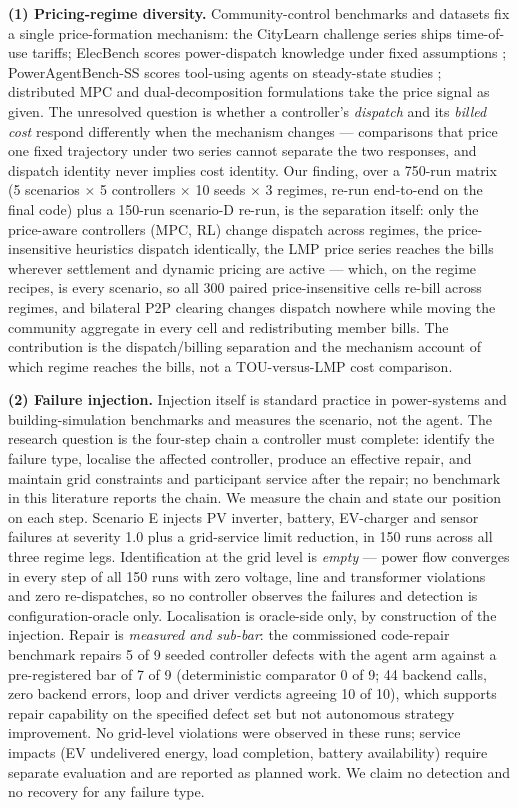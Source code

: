 \documentclass[11pt,a4paper]{article}
\begin{document}
\textbf{(1) Pricing-regime diversity.} Community-control benchmarks and datasets
fix a single price-formation mechanism: the CityLearn challenge series ships
time-of-use tariffs; ElecBench scores power-dispatch knowledge under fixed
assumptions \cite{zhou2025elecbench}; PowerAgentBench-SS scores tool-using
agents on steady-state studies \cite{mylonas2026poweragentbench}; distributed
MPC and dual-decomposition formulations \cite{yfantis2024dual, su2021dual} take
the price signal as given. The unresolved question is whether a controller's
\emph{dispatch} and its \emph{billed cost} respond differently when the
mechanism changes --- comparisons that price one fixed trajectory under two
series cannot separate the two responses, and dispatch identity never implies
cost identity. Our finding, over a 750-run matrix (5 scenarios $\times$ 5
controllers $\times$ 10 seeds $\times$ 3 regimes, re-run end-to-end on the
final code) plus a 150-run scenario-D re-run, is the separation itself: only
the price-aware controllers (MPC, RL)
change dispatch across regimes, the price-insensitive heuristics dispatch
identically, the LMP price series reaches the bills wherever settlement and
dynamic pricing are active --- which, on the regime recipes, is every
scenario, so all 300 paired price-insensitive cells re-bill across regimes,
and bilateral P2P clearing changes dispatch nowhere while moving the
community aggregate in every cell and redistributing member bills. The
contribution is the dispatch/billing
separation and the mechanism account of which regime reaches the bills, not a
TOU-versus-LMP cost comparison.

\textbf{(2) Failure injection.} Injection itself is standard practice in
power-systems and building-simulation benchmarks and measures the scenario,
not the agent. The research question is the four-step chain a controller must
complete: identify the failure type, localise the affected controller, produce
an effective repair, and maintain grid constraints and participant service
after the repair; no benchmark in this literature reports the chain. We measure
the chain and state our position on each step. Scenario E injects PV inverter,
battery, EV-charger and sensor failures at severity 1.0 plus a grid-service
limit reduction, in 150 runs across all three regime legs. Identification at
the grid level is \emph{empty} --- power flow converges in every step of all
150 runs with zero voltage, line and transformer violations and zero
re-dispatches, so no controller observes the failures and detection is
configuration-oracle only. Localisation is oracle-side only, by construction of
the injection. Repair is \emph{measured and sub-bar}: the commissioned
code-repair benchmark repairs 5 of 9 seeded controller defects with the agent
arm against a pre-registered bar of 7 of 9 (deterministic comparator 0 of 9; 44
backend calls, zero backend errors, loop and driver verdicts agreeing 10 of
10), which supports repair capability on the specified defect set but not
autonomous strategy improvement.
No grid-level violations were observed in these runs; service impacts
(EV undelivered energy, load completion, battery availability) require
separate evaluation and are reported as planned work. We claim no detection
and no recovery for any failure type.
\end{document}
